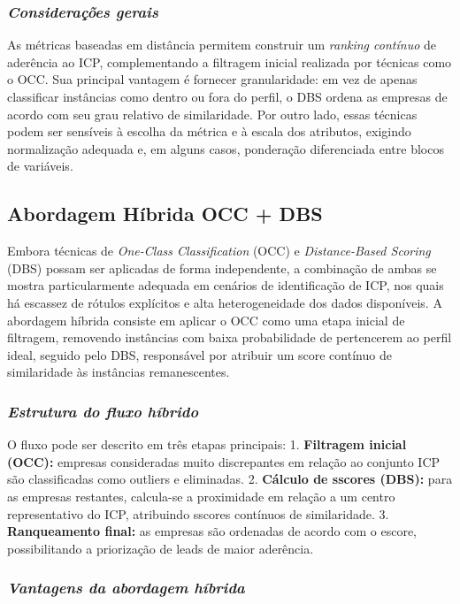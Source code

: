 \subsubsection{\textit{Considerações gerais}}

As métricas baseadas em distância permitem construir um \textit{ranking
contínuo} de aderência ao ICP, complementando a filtragem inicial
realizada por técnicas como o OCC. Sua principal vantagem é fornecer
granularidade: em vez de apenas classificar instâncias como dentro ou
fora do perfil, o DBS ordena as empresas de acordo com seu grau relativo
de similaridade. Por outro lado, essas técnicas podem ser sensíveis à
escolha da métrica e à escala dos atributos, exigindo normalização
adequada e, em alguns casos, ponderação diferenciada entre blocos de
variáveis.


\subsection{\textbf{Abordagem Híbrida OCC + DBS}}

Embora técnicas de \textit{One-Class Classification} (OCC) e \textit{Distance-Based
Scoring} (DBS) possam ser aplicadas de forma independente, a combinação
de ambas se mostra particularmente adequada em cenários de identificação
de ICP, nos quais há escassez de rótulos explícitos e alta
heterogeneidade dos dados disponíveis. A abordagem híbrida consiste em
aplicar o OCC como uma etapa inicial de filtragem, removendo instâncias
com baixa probabilidade de pertencerem ao perfil ideal, seguido pelo
DBS, responsável por atribuir um score contínuo de similaridade às
instâncias remanescentes.

\subsubsection{\textit{Estrutura do fluxo híbrido}}

O fluxo pode ser descrito em três etapas principais:  
1. \textbf{Filtragem inicial (OCC):} empresas consideradas muito discrepantes em relação ao
conjunto ICP são classificadas como outliers e eliminadas.  
2. \textbf{Cálculo de sscores (DBS):} para as empresas restantes, calcula-se
a proximidade em relação a um centro representativo do ICP, atribuindo
sscores contínuos de similaridade.  
3. \textbf{Ranqueamento final:} as empresas são ordenadas de acordo com o
escore, possibilitando a priorização de leads de maior aderência.

\subsubsection{\textit{Vantagens da abordagem híbrida}}

